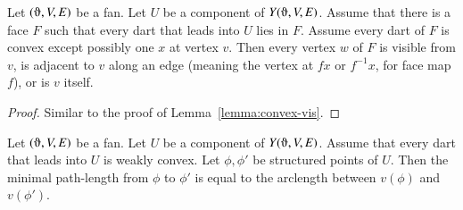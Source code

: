 \begin{lemma}
Let $(\orgn,V,E)$ be a fan.  Let $U$ be a component of $Y(\orgn,V,E)$.  Assume that there is a face $F$ such that every dart that leads into $U$ lies in $F$.  Assume every dart of $F$ is convex 
except possibly one $x$
at vertex $v$.  Then  every vertex $w$ of $F$ is visible from $v$, is adjacent to $v$ along an edge (meaning the vertex at $f x$ or $f^{-1} x$, for face map $f$), or is $v$ itself.
\end{lemma}

\begin{proof} Similar to the proof of Lemma~\ref{lemma:convex-vis}.
\end{proof}


\begin{lemma}
Let $(\orgn,V,E)$ be a fan.  Let $U$ be a component of $Y(\orgn,V,E)$.
Assume that every dart that leads into $U$ is weakly convex.  Let
$\phi,\phi'$ be structured points of $U$.  Then the minimal path-length
from $\phi$ to $\phi'$ is equal to the arclength between $v(\phi)$ and
$v(\phi')$.
\end{lemma}


